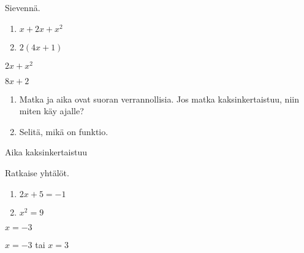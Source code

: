 \begin{tehtava}
Sievennä.
\begin{enumerate}
\item $x + 2x+x^2$
\item $2(4x+1)$
\end{enumerate}
\begin{vastaus}
\item $2x +x^2$
\item $8x+2$
\end{vastaus}
\end{tehtava}

\begin{tehtava}
\begin{enumerate}
\item Matka ja aika ovat suoran verrannollisia. Jos matka kaksinkertaistuu, niin miten käy ajalle?
\item Selitä, mikä on funktio.
\end{enumerate}
\begin{vastaus}
\item Aika kaksinkertaistuu
\item %
\end{vastaus}
\end{tehtava}

\begin{tehtava}
Ratkaise yhtälöt.
\begin{enumerate}
\item $2x+5 = -1$
\item $x^2 = 9$
\end{enumerate}
\begin{vastaus}
\item $x=-3$
\item $x=-3$ tai $x=3$
\end{vastaus}
\end{tehtava}